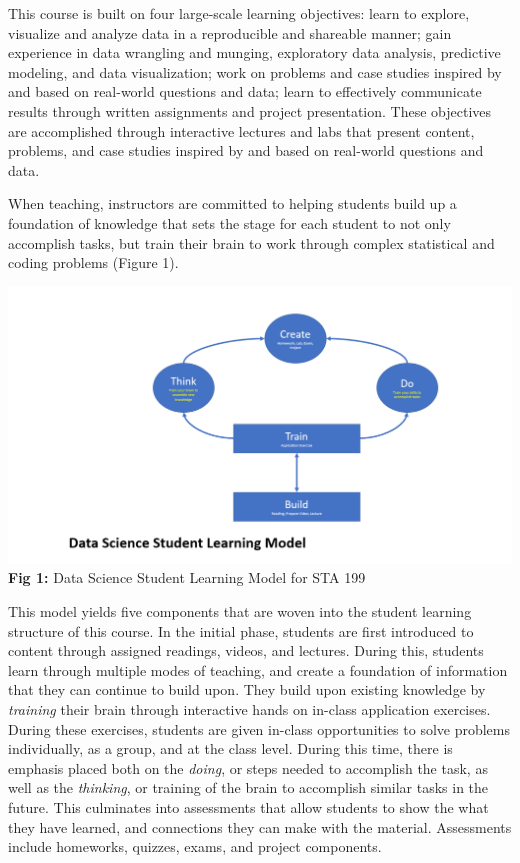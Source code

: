 \documentclass[
  12pt]{article}
\begin{document}
This course is built on four large-scale learning objectives: learn to
explore, visualize and analyze data in a reproducible and shareable
manner; gain experience in data wrangling and munging, exploratory data
analysis, predictive modeling, and data visualization; work on problems
and case studies inspired by and based on real-world questions and data;
learn to effectively communicate results through written assignments and
project presentation. These objectives are accomplished through
interactive lectures and labs that present content, problems, and case
studies inspired by and based on real-world questions and data.

When teaching, instructors are committed to helping students build up a
foundation of knowledge that sets the stage for each student to not only
accomplish tasks, but train their brain to work through complex
statistical and coding problems (Figure 1).

\includegraphics{images/learning_model.png} \textbf{Fig 1:} Data Science
Student Learning Model for STA 199

This model yields five components that are woven into the student
learning structure of this course. In the initial phase, students are
first introduced to content through assigned readings, videos, and
lectures. During this, students learn through multiple modes of
teaching, and create a foundation of information that they can continue
to build upon. They build upon existing knowledge by \emph{training}
their brain through interactive hands on in-class application exercises.
During these exercises, students are given in-class opportunities to
solve problems individually, as a group, and at the class level. During
this time, there is emphasis placed both on the \emph{doing}, or steps
needed to accomplish the task, as well as the \emph{thinking}, or
training of the brain to accomplish similar tasks in the future. This
culminates into assessments that allow students to show the what they
have learned, and connections they can make with the material.
Assessments include homeworks, quizzes, exams, and project components.
\end{document}
